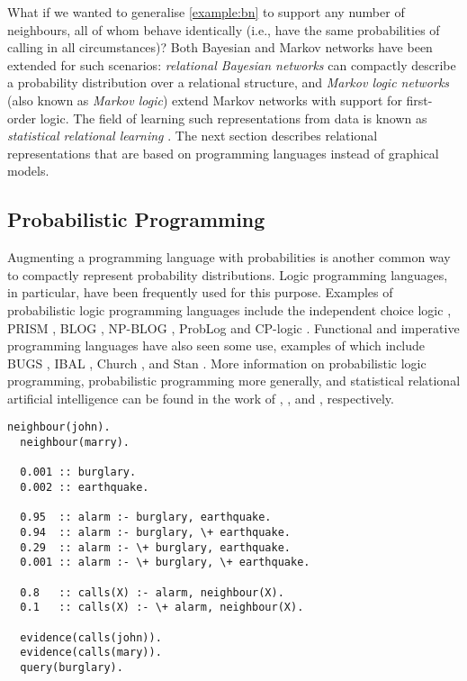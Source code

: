 What if we wanted to generalise \cref{example:bn} to support any number of neighbours, all of whom behave identically (i.e., have the same probabilities of calling in all circumstances)? Both Bayesian and Markov networks have been extended for such scenarios: \emph{relational Bayesian networks} \citep{DBLP:conf/uai/Jaeger97} can compactly describe a probability distribution over a relational structure, and \emph{Markov logic networks} (also known as \emph{Markov logic}) \citep{DBLP:journals/ml/RichardsonD06} extend Markov networks with support for first-order logic. The field of learning such representations from data is known as \emph{statistical relational learning} \citep{DBLP:series/synthesis/2016Raedt}. The next section describes relational representations that are based on programming languages instead of graphical models.

\subsection{Probabilistic Programming} \label{sec:probprogramming}

Augmenting a programming language with probabilities is another common way to compactly represent probability distributions. Logic programming languages, in particular, have been frequently used for this purpose. Examples of probabilistic logic programming languages include the independent choice logic \citep{DBLP:journals/ai/Poole97,DBLP:conf/ilp/Poole08}, PRISM \citep{DBLP:conf/ijcai/SatoK97,DBLP:conf/ilp/SatoK08}, BLOG \citep{DBLP:conf/ijcai/MilchMRSOK05}, NP-BLOG \citep{DBLP:conf/uai/CarbonettoKFP05}, ProbLog \citep{DBLP:conf/ijcai/RaedtKT07} and CP-logic \citep{DBLP:journals/tplp/VennekensDB09}. Functional and imperative programming languages have also seen some use, examples of which include BUGS \citep{gilks1994language}, IBAL \citep{DBLP:conf/ijcai/Pfeffer01}, Church \citep{DBLP:conf/uai/GoodmanMRBT08}, and Stan \citep{stan}. More information on probabilistic logic programming, probabilistic programming more generally, and statistical relational artificial intelligence can be found in the work of \citet{DBLP:conf/ilp/2008p}, \citet{DBLP:conf/icse/GordonHNR14}, and \citet{DBLP:series/synthesis/2016Raedt}, respectively.

\begin{lstlisting}[caption=A ProbLog program that computes $\protect{\Pr(B \mid J, M)}$ for the scenario described in \cref{example:bn}, label={lst:problog}]
  neighbour(john).
  neighbour(marry).

  0.001 :: burglary.
  0.002 :: earthquake.

  0.95  :: alarm :- burglary, earthquake.
  0.94  :: alarm :- burglary, \+ earthquake.
  0.29  :: alarm :- \+ burglary, earthquake.
  0.001 :: alarm :- \+ burglary, \+ earthquake.

  0.8   :: calls(X) :- alarm, neighbour(X).
  0.1   :: calls(X) :- \+ alarm, neighbour(X).

  evidence(calls(john)).
  evidence(calls(mary)).
  query(burglary).
\end{lstlisting}

